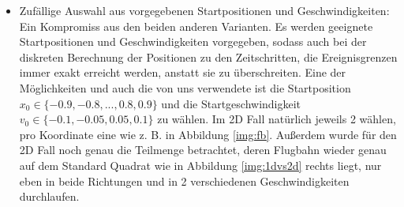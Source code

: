 \begin{description}
\begin{itemize}
		\item Zufällige Auswahl aus vorgegebenen Startpositionen und Geschwindigkeiten: Ein Kompromiss aus den beiden anderen Varianten. Es werden geeignete Startpositionen und Geschwindigkeiten vorgegeben, sodass auch bei der diskreten Berechnung der Positionen zu den Zeitschritten, die Ereignisgrenzen immer exakt erreicht werden, anstatt sie zu überschreiten. Eine der Möglichkeiten und auch die von uns verwendete ist die Startposition $ x_{0} \in \{-0.9,-0.8, ... ,0.8,0.9\} $ und die Startgeschwindigkeit $ v_{0} \in \{-0.1,-0.05,0.05,0.1\} $ zu wählen. Im 2D Fall natürlich jeweils 2 wählen, pro Koordinate eine wie z. B. in Abbildung \ref{img:fb}. Außerdem wurde für den 2D Fall noch genau die Teilmenge betrachtet, deren Flugbahn wieder genau auf dem Standard Quadrat wie in Abbildung \ref{img:1dvs2d} rechts liegt, nur eben in beide Richtungen und in 2 verschiedenen Geschwindigkeiten durchlaufen. 
		

\end{itemize}
\end{description}
